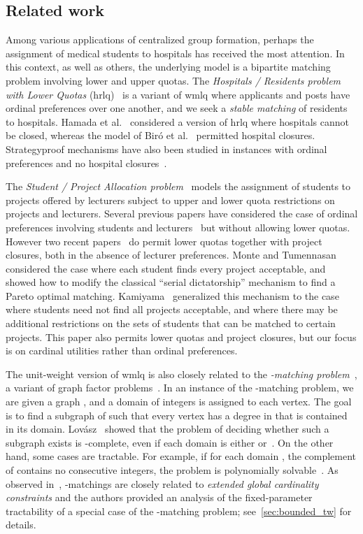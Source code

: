\documentclass{llncs}
\begin{document}
\subsection{Related work}\label{sec:rWork}

Among various applications of centralized group formation, perhaps the assignment of medical students to hospitals has received the most attention. In this context, as well as others, the underlying model is a bipartite matching problem involving lower and upper quotas. The \emph{Hospitals / Residents problem with Lower Quotas} ({\sc hrlq})~\cite{BFIM10,HIM14} is a variant of {\sc wmlq} where applicants and posts have ordinal preferences over one another, and we seek a \emph{stable matching} of residents to hospitals. Hamada et al.~\cite{HIM14} considered a version of {\sc hrlq} where hospitals cannot be closed, whereas the model of Bir\'o et al.~\cite{BFIM10} permitted hospital closures. Strategyproof mechanisms have also been studied in instances with ordinal preferences and no hospital closures~\cite{FITUY15,GHIKUYY14,GKHIY15}.

The \emph{Student / Project Allocation problem}~\cite[Section 5.6]{Man13} models the assignment of students to projects offered by lecturers subject to upper and lower quota restrictions on projects and lecturers. Several previous papers have considered the case of ordinal preferences involving students and lecturers~\cite{AIM07,IMY12,MO08} but without allowing lower quotas. However two recent papers~\cite{Kam13,MT13} do permit lower quotas together with project closures, both in the absence of lecturer preferences. Monte and Tumennasan~\cite{MT13} considered the case where each student finds every project acceptable, and showed how to modify the classical ``serial dictatorship'' mechanism to find a Pareto optimal matching. Kamiyama~\cite{Kam13} generalized this mechanism to the case where students need not find all projects acceptable, and where there may be additional restrictions on the sets of students that can be matched to certain projects. This paper also permits lower quotas and project closures, but our focus is on cardinal utilities rather than  ordinal preferences.

The unit-weight version of {\sc wmlq} is also closely related to the \emph{-matching problem}~\cite{Cor88,Lov73,Seb93}, a variant of graph factor problems~\cite{Plu07}.  In an instance of the -matching problem, we are given a graph , and a domain of integers is assigned to each vertex. The goal is to find a subgraph  of  such that every vertex has a degree in  that is contained in its domain. Lov\'asz~\cite{Lov72} showed that the problem of deciding whether such a subgraph exists is -complete, even if each domain is either  or~. On the other hand, some cases are tractable.  For example, if for each domain , the complement of  contains no consecutive integers, the problem is polynomially solvable~\cite{Seb93}. 
As observed in~\cite{SS11}, -matchings are closely related to \emph{extended global cardinality constraints} and the authors provided an analysis of the fixed-parameter tractability of a special case of the -matching problem; see~\cref{sec:bounded_tw} for details.
\end{document}
